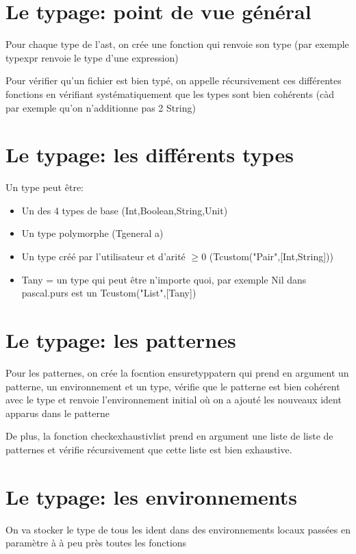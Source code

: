 \documentclass[12pt,a4paper,french]{article}
\begin{document}
\part*{Le typage: point de vue général}

Pour chaque type de l'ast, on crée une fonction qui renvoie son type (par exemple typexpr renvoie le type d'une expression)

Pour vérifier qu'un fichier est bien typé, on appelle récursivement ces différentes fonctions en vérifiant systématiquement
que les types sont bien cohérents (càd par exemple qu'on n'additionne pas 2 String)


\part*{Le typage: les différents types}

Un type peut être:

\begin{itemize}
	\item Un des 4 types de base (Int,Boolean,String,Unit)
	\item Un type polymorphe (Tgeneral a)
	\item Un type créé par l'utilisateur et d'arité $\geq 0$ (Tcustom("Pair",[Int,String]))
	\item Tany = un type qui peut être n'importe quoi, par exemple Nil dans pascal.purs est un Tcustom("List",[Tany])
\end{itemize}


\part*{Le typage: les patternes}

Pour les patternes, on crée la focntion ensuretyppatern qui prend en argument un patterne, un environnement et un type, vérifie
que le patterne est bien cohérent avec le type et renvoie l'environnement initial où on a ajouté les nouveaux ident apparus dans le patterne

De plus, la fonction checkexhaustivlist prend en argument une liste de liste de patternes et vérifie récursivement que cette liste est bien exhaustive.


\part*{Le typage: les environnements}

On va stocker le type de tous les ident dans des environnements locaux passées en paramètre à à peu près toutes les fonctions
\end{document}

